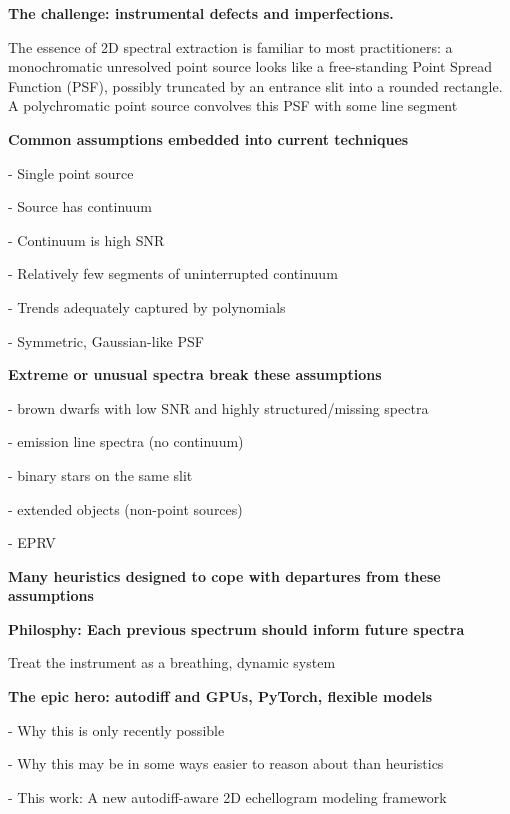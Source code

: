 \documentclass[twocolumn]{aastex63}
\begin{document}
\textbf{The challenge: instrumental defects and imperfections.}

The essence of 2D spectral extraction is familiar to most practitioners: a monochromatic unresolved point source looks like a free-standing Point Spread Function (PSF), possibly truncated by an entrance slit into a rounded rectangle.  A polychromatic point source convolves this PSF with some line segment

\begin{mdframed}
  \textbf{Common assumptions embedded into current techniques} \par
  - Single point source\par
  - Source has continuum\par
  - Continuum is high SNR\par
  - Relatively few segments of uninterrupted continuum\par
  - Trends adequately captured by polynomials\par
  - Symmetric, Gaussian-like PSF\par
\end{mdframed}

\begin{mdframed}
  \textbf{Extreme or unusual spectra break these assumptions} \par
  - brown dwarfs with low SNR and highly structured/missing spectra\par
  - emission line spectra (no continuum)\par
  - binary stars on the same slit\par
  - extended objects (non-point sources)\par
  - EPRV\par
\end{mdframed}

\begin{mdframed}
  \textbf{Many heuristics designed to cope with departures from these assumptions} \par
  \textcolor{lightgray}{\lipsum[4]}
\end{mdframed}

\begin{mdframed}
  \textbf{Philosphy: Each previous spectrum should inform future spectra} \par
  Treat the instrument as a breathing, dynamic system\par
  \textcolor{lightgray}{\lipsum[5]}
\end{mdframed}

\begin{mdframed}
  \textbf{The epic hero: autodiff and GPUs, PyTorch, flexible models} \par
  - Why this is only recently possible\par
  - Why this may be in some ways easier to reason about than heuristics\par
  - This work: A new autodiff-aware 2D echellogram modeling framework\par
  \textcolor{lightgray}{\lipsum[6]}
\end{mdframed}
\end{document}

